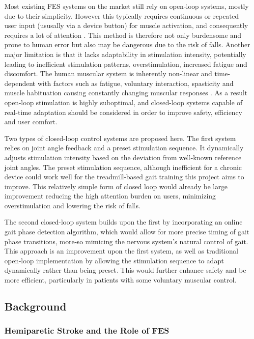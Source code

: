 Most existing FES systems on the market still rely on open-loop systems, mostly due to their simplicity\cite{braz_functional_2009}. However this typically requires continuous or repeated user input (ususally via a device button) for muscle activation, and consequently requires a lot of attention \cite{hayami_development_2022}. This method is therefore not only burdensome and prone to human error but also may be dangerous due to the risk of falls. Another major limitation is that it lacks adaptability in stimulation intensity, potentially leading to inefficient stimulation patterns, overstimulation, increased fatigue and discomfort. The human muscular system is inherently non-linear and time-dependent with factors such as fatigue, voluntary interaction, spasticity and muscle habituation causing constantly changing muscular responses . As a result open-loop stimulation is highly suboptimal, and closed-loop systems capable of real-time adaptation should be considered in order to improve safety, efficiency and user comfort.

Two types of closed-loop control systems are proposed here. The first system relies on joint angle feedback and a preset stimulation sequence. It dynamically adjusts stimulation intensity based on the deviation from well-known reference joint angles. The preset stimulation sequence, although inefficient for a chronic device could work well for the treadmill-based gait training this project aims to improve. This relatively simple form of closed loop would already be large improvement reducing the high attention burden on users, minimizing overstimulation and lowering the risk of falls.  

The second closed-loop system builds upon the first by incorporating an online gait phase detection algorithm, which would allow for more precise timing of gait phase transitions, more-so mimicing the nervous system's natural control of gait. This approach is an improvement upon the first system, as well as traditional open-loop implementation by allowing the stimulation sequence to adapt dynamically rather than being preset. This would further enhance safety and be more efficient, particularly in patients with some voluntary muscular control.


\subsection{Background}
\subsubsection{Hemiparetic Stroke and the Role of FES}

